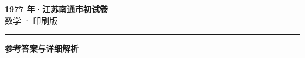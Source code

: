 \documentclass[zihao=5, a4paper]{ctexart}
\begin{document}
\begin{center}
  {\Large\bfseries 1977 年·江苏南通市初试卷}\\[4pt]
  {\large 数学 · 印刷版}
\end{center}
\medskip
{}

\par\bigskip\hrule\bigskip
{}
\begin{center}{\large\bfseries 参考答案与详细解析}\end{center}
\smallskip

\end{document}
